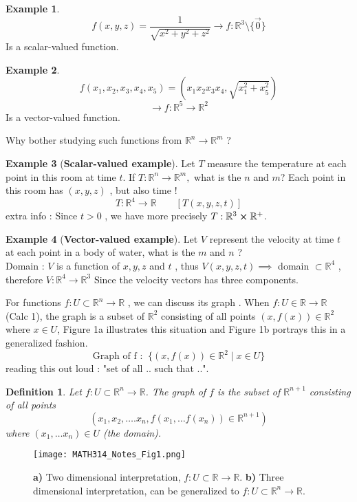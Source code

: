 \documentclass[
	12pt,
	]{article}
\newcommand{\Rn}{\mathbb{R}^{n}}
\newcommand{\R}{\mathbb{R}}
\newcommand{\Rm}{\mathbb{R}^{m}}
\theoremstyle{custom}
\theoremstyle{custom}
\theoremstyle{custom}
\theoremstyle{custom}
\newtheorem{definition}{Definition}[section]
\theoremstyle{custom}
\theoremstyle{definition}
\newtheorem{example}{Example}[section]
\theoremstyle{example}
\theoremstyle{note}
\theoremstyle{remark}
\theoremstyle{example}
\newcounter{theo}[section]\setcounter{theo}{0}
\numberwithin{equation}{subsection}
\begin{document}
	\begin{example}
		$$ f(x,y,z) = \frac{1}{\sqrt{x^{2}+y^{2}+z^{2}}} \xrightarrow{} f: \mathbb{R}^{3} \text{\textbackslash}  \{\vec{0}\} $$ 
		Is a scalar-valued function.
	\end{example}
	
	\begin{example}
		$$ f(x_{1} , x_{2}, x_{3},x_{4},x_{5}) = \left(x_{1}x_{2}x_{3}x_{4} , \sqrt{x_{1}^{2}+x_{5}^{2}}\right)$$
		$$ \xrightarrow{	} f: \mathbb{R}^{5} \to \mathbb{R}^{2}$$
		Is a vector-valued function.
	\end{example}
	
	\noindent Why bother studying such functions from $ \Rn \to \Rm $ ? 
	
	\begin{example}[\textbf{Scalar-valued example}] 
		Let $ T $ measure the temperature at each point in this room at time $t$. If $ T : \Rn \to \Rm, $ what is the $n$ and $ m $? Each point in this room has $(x,y,z) $ , but also time !
			$$ T : \mathbb{R}^{4} \to \mathbb{R} \qquad [T(x,y,z,t)]$$
			extra info : Since $t>0$ , we have more precisely $T : \mathbb{R}^{3} \cross \mathbb{R}^{+}$.
	\end{example}
	
	\begin{example}[\textbf{Vector-valued example}] 
		Let $V$ represent the velocity at time $t$ at each point in a body of water, what is the $m$ and $n$ ? \\
			Domain : $V$ is a function of $x,y,z$ and $t$ , thus $V(x,y,z,t) \implies$ domain $\subset  \mathbb{R}^{4}$ , therefore $V : \mathbb{R}^{4} \to \mathbb{R}^{3}$ Since the velocity vectors has three components.
	\end{example}
	
	 For functions $f: U \subset \Rn \to \R$ , we can discuss its graph . When $f : U \in \R \to \R$ (Calc 1), the graph is a subset of $\mathbb{R}^{2}$ consisting of all points $(x,f(x)) \in \mathbb{R}^{2}$ where $x\in U$, Figure 1a illustrates this situation and Figure 1b portrays this in a generalized fashion. 
	$$ \text{Graph of f : } \ \{(x,f(x)) \in \mathbb{R}^{2} \mid x\in U\}$$
	reading this out loud : "set of all .. such that ..".
	
	\begin{definition}
		Let $f : U \subset \Rn \to \R$. The graph of $ f $ is the subset of $\mathbb{R}^{n+1}$ consisting of all points $$(x_{1},x_{2 }, \dots . x_{n}, f(x_{1} , \dots f(x_{n})) \in \mathbb{R}^{n+1})$$ where $ (x_{1}, \dots x_{n}) \in U $ (the domain).
	\end{definition} 
	\begin{figure}[H]
		   		 	\centering
		   		 	\texttt{[image: MATH314\_Notes\_Fig1.png]}
		   		 	\captionsetup{margin=1cm, justification=raggedright}\caption{\textbf{a)} Two dimensional  interpretation, $f:U\subset \R \to \R$. \textbf{b)} Three dimensional interpretation, can be generalized to $f:U\subset \Rn \to \R$.}
		   		 \end{figure}  
	
\end{document}
